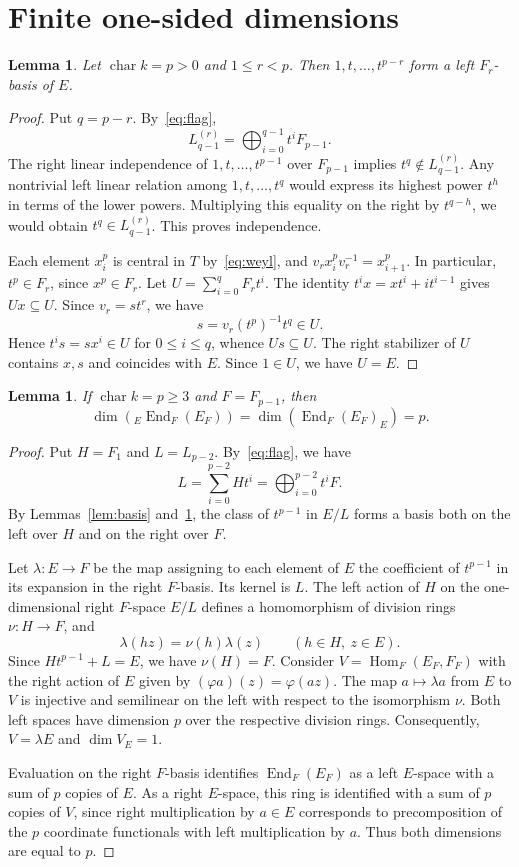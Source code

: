\documentclass[11pt,a4paper,reqno]{amsart}
\numberwithin{equation}{section}
\newtheorem{lemma}[theorem]{Lemma}
\theoremstyle{remark}
\newcommand{\End}{\operatorname{End}}
\newcommand{\Hom}{\operatorname{Hom}}
\begin{document}
\section{Finite one-sided dimensions}

\begin{lemma}\label{lem:left}
Let $\operatorname{char} k=p>0$ and $1\le r<p$.
Then $1,t,\ldots,t^{p-r}$ form a left $F_r$-basis of $E$.
\end{lemma}
\begin{proof}
Put $q=p-r$. By~\eqref{eq:flag},
\[
 L_{q-1}^{(r)}=\bigoplus_{i=0}^{q-1}t^i F_{p-1}.
\]
The right linear independence of $1,t,\ldots,t^{p-1}$ over $F_{p-1}$
implies $t^q\notin L_{q-1}^{(r)}$. Any nontrivial left linear relation
among $1,t,\ldots,t^q$ would express its highest power $t^h$
in terms of the lower powers. Multiplying this equality on the right by $t^{q-h}$,
we would obtain $t^q\in L_{q-1}^{(r)}$. This proves independence.

Each element $x_i^p$ is central in $T$ by~\eqref{eq:weyl}, and
$v_r x_i^p v_r^{-1}=x_{i+1}^p$. In particular, $t^p\in F_r$,
since $x^p\in F_r$. Let $U=\sum_{i=0}^q F_rt^i$.
The identity $t^i x=xt^i+i t^{i-1}$ gives $Ux\subseteq U$.
Since $v_r=st^r$, we have
\[
 s=v_r(t^p)^{-1}t^q\in U .
\]
Hence $t^i s=sx^i\in U$ for $0\le i\le q$, whence $Us\subseteq U$.
The right stabilizer of $U$ contains $x,s$ and coincides with $E$. Since $1\in U$,
we have $U=E$.
\end{proof}

\begin{lemma}\label{lem:mat}
If $\operatorname{char}k=p\ge3$ and $F=F_{p-1}$, then
\[
 \dim({}_E\End_F(E_F))=\dim(\End_F(E_F)_E)=p .
\]
\end{lemma}
\begin{proof}
Put $H=F_1$ and $L=L_{p-2}$.
By~\eqref{eq:flag}, we have
\[
 L=\sum_{i=0}^{p-2}Ht^i=\bigoplus_{i=0}^{p-2}t^i F .
\]
By Lemmas~\ref{lem:basis} and~\ref{lem:left}, the class of $t^{p-1}$ in $E/L$ forms a basis both on the left over $H$
and on the right over $F$.

Let $\lambda:E\to F$ be the map assigning
to each element of $E$ the coefficient of $t^{p-1}$ in its expansion in the right $F$-basis. Its kernel is $L$. The left action of $H$ on
the one-dimensional right $F$-space $E/L$ defines a homomorphism of division rings
$\nu:H\to F$, and
\[
 \lambda(hz)=\nu(h)\lambda(z)\qquad(h\in H,\ z\in E).
\]
Since $H t^{p-1}+L=E$, we have $\nu(H)=F$.
Consider $V=\Hom_F(E_F,F_F)$ with the right action of $E$
given by $(\varphi a)(z)=\varphi(az)$.
The map $a\mapsto\lambda a$ from $E$ to $V$ is injective and
semilinear on the left with respect to the isomorphism $\nu$.
Both left spaces have dimension $p$ over the respective division rings.
Consequently, $V=\lambda E$ and $\dim V_E=1$.

Evaluation on the right $F$-basis identifies $\End_F(E_F)$ as a left
$E$-space with a sum of $p$ copies of $E$. As a right $E$-space,
this ring is identified with a sum of $p$ copies of $V$, since right multiplication
by $a\in E$ corresponds to precomposition of the $p$ coordinate functionals with left
multiplication by $a$. Thus both dimensions are equal to $p$.

\end{proof}
\end{document}
